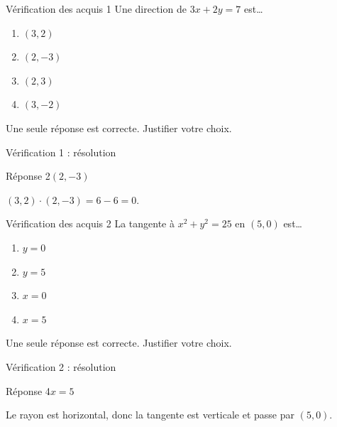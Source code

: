 \documentclass[aspectratio=169,12pt]{beamer}
\begin{document}
\renewcommand{\slidekind}{À VOUS DE JOUER}\begin{frame}[t]{Vérification des acquis 1}
Une direction de $3x+2y=7$ est…\begin{enumerate}
\item $(3,2)$
\item $(2,-3)$
\item $(2,3)$
\item $(3,-2)$
\end{enumerate}\medskip Une seule réponse est correcte. Justifier votre choix.\end{frame}
\renewcommand{\slidekind}{COMPRENDRE LA RÉPONSE}\begin{frame}[t]{Vérification 1 : résolution}
\begin{block}{Réponse 2}$(2,-3)$\end{block}\medskip $(3,2)\cdot(2,-3)=6-6=0$.\end{frame}
\renewcommand{\slidekind}{À VOUS DE JOUER}\begin{frame}[t]{Vérification des acquis 2}
La tangente à $x^2+y^2=25$ en $(5,0)$ est…\begin{enumerate}
\item $y=0$
\item $y=5$
\item $x=0$
\item $x=5$
\end{enumerate}\medskip Une seule réponse est correcte. Justifier votre choix.\end{frame}
\renewcommand{\slidekind}{COMPRENDRE LA RÉPONSE}\begin{frame}[t]{Vérification 2 : résolution}
\begin{block}{Réponse 4}$x=5$\end{block}\medskip Le rayon est horizontal, donc la tangente est verticale et passe par $(5,0)$.\end{frame}
\end{document}
